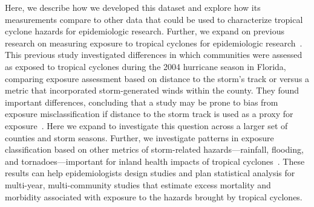 Here, we describe how we developed this dataset and explore how its
measurements compare to other data that could be used to characterize tropical
cyclone hazards for epidemiologic research. Further, we expand on previous
research on measuring exposure to tropical cyclones for epidemiologic
research~\parencite{grabich2015measuring}. This previous study investigated
differences in which communities were assessed as exposed to tropical cyclones
during the 2004 hurricane season in Florida, comparing exposure assessment
based on distance to the storm's track or versus a metric that incorporated
storm-generated winds within the county.  They found important differences,
concluding that a study may be prone to bias from exposure misclassification if
distance to the storm track is used as a proxy for
exposure~\parencite{grabich2015measuring}.  Here we expand to investigate this
question across a larger set of counties and storm seasons.  Further, we
investigate patterns in exposure classification based on other metrics of
storm-related hazards---rainfall, flooding, and tornadoes---important for
inland health impacts of tropical cyclones~\parencite{czajkowski2011,
moore2012}. These results can help epidemiologists design studies and plan
statistical analysis for multi-year, multi-community studies that estimate
excess mortality and morbidity associated with exposure to the hazards brought
by tropical cyclones. 
